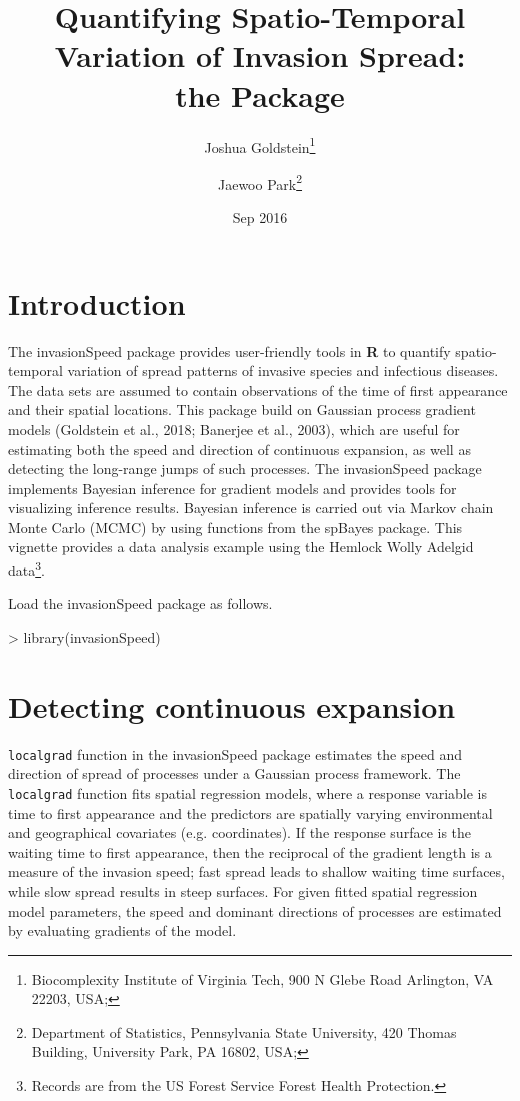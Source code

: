 \documentclass{article}
\title{ Quantifying Spatio-Temporal Variation of Invasion Spread:\\
the \pkg{invasionSpeed} Package }
\author{Joshua Goldstein\footnote{Biocomplexity Institute of Virginia Tech, 900 N Glebe Road Arlington, VA 22203, USA; \code{joshg22@vt.edu}}
\and
Jaewoo Park\footnote{Department of Statistics, Pennsylvania State University, %
420 Thomas Building, University Park, PA 16802, USA; \code{jzp191@psu.edu}}}
\date{Sep 2016}
\newcommand{\strong}[1]{{\normalfont\fontseries{b}\selectfont #1}}
\let\pkg=\strong
\newcommand{\code}[1]{{\tt #1}}
\newcommand{\proglang}[1]{{\bf #1}}
\begin{document}


\maketitle
\tableofcontents

\section{Introduction}

The \pkg{invasionSpeed} package provides user-friendly tools in \proglang{R} to quantify spatio-temporal variation of spread patterns of invasive species and infectious diseases. The data sets are assumed to contain observations of the time of first appearance and their spatial locations. This package build on Gaussian process gradient models (Goldstein et al., 2018; Banerjee et al., 2003), which are useful for estimating both the speed and direction of continuous expansion, as well as detecting the long-range jumps of such processes. The \pkg{invasionSpeed} package implements Bayesian inference for gradient models and provides tools for visualizing inference results. Bayesian inference is carried out via Markov chain Monte Carlo (MCMC) by using functions from the \pkg{spBayes} package. This vignette provides a data analysis example using the Hemlock Wolly Adelgid data\footnote{Records are from the US Forest Service Forest Health Protection.}.

Load the \pkg{invasionSpeed} package as follows.
\begin{Schunk}
\begin{Sinput}
> library(invasionSpeed)
\end{Sinput}
\end{Schunk}


\section{Detecting continuous expansion}

\code{localgrad} function in the \pkg{invasionSpeed} package estimates the speed and direction of spread of processes under a Gaussian process framework. The \code{localgrad} function fits spatial regression models, where a response variable is time to first appearance and the predictors are spatially varying environmental and geographical covariates (e.g. coordinates). If the response surface is the waiting time to first appearance, then the reciprocal of the gradient length is a measure of the invasion speed; fast spread leads to shallow waiting time surfaces, while slow spread results in steep surfaces. For given fitted spatial regression model parameters, the speed and dominant directions of processes are estimated by evaluating gradients of the model.
\end{document}
